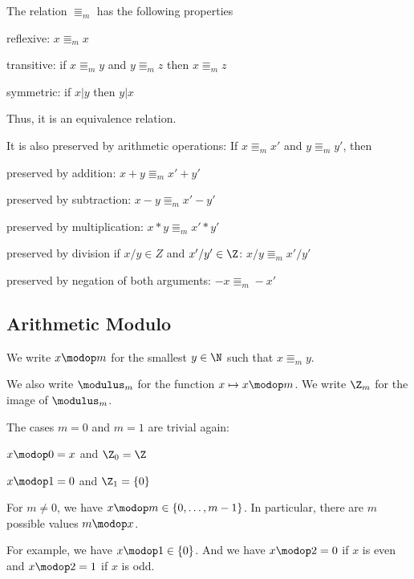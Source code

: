\begin{theorem}[Modulo]\label{thm:modulo}
The relation $\Equiv_m$ has the following properties
\begin{compactitem}
\item reflexive: $x\Equiv_m x$
\item transitive: if $x\Equiv_m y$ and $y\Equiv_m z$ then $x\Equiv_m z$
\item symmetric: if $x|y$ then $y|x$
\end{compactitem}
Thus, it is an equivalence relation.
\medskip

It is also preserved by arithmetic operations: If $x\Equiv_m x'$ and $y\Equiv_m y'$, then
\begin{compactitem}
\item preserved by addition: $x+y\Equiv_m x'+y'$
\item preserved by subtraction: $x-y\Equiv_m x'-y'$
\item preserved by multiplication: $x*y\Equiv_m x'*y'$
\item preserved by division if $x/y\in Z$ and $x'/y'\in \Z$: $x/y\Equiv_m x'/y'$
\item preserved by negation of both arguments: $-x\Equiv_m -x'$
\end{compactitem}
\end{theorem}

\subsection{Arithmetic Modulo}\label{sec:math:moduloarith}

\begin{definition}[Modulus]\label{def:math:modulofun}
 We write $x\modop m$ for the smallest $y\in\N$ such that $x\Equiv_m y$.
 
 We also write $\modulus_m$ for the function $x\mapsto x\modop m$.
 We write $\Z_m$ for the image of $\modulus_m$.
\end{definition}

\begin{remark}
The cases $m=0$ and $m=1$ are trivial again:
\begin{compactitem}
\item $x\modop 0=x$ and $\Z_0=\Z$
\item $x\modop 1=0$ and $\Z_1=\{0\}$
\end{compactitem}
\end{remark}

\begin{remark}
For $m\neq 0$, we have $x\modop m\in \{0,\ldots,m-1\}$.
In particular, there are $m$ possible values $m\modop x$.

For example, we have $x\modop 1\in \{0\}$.
And we have $x\modop 2=0$ if $x$ is even and $x\modop 2=1$ if $x$ is odd.
\end{remark}

